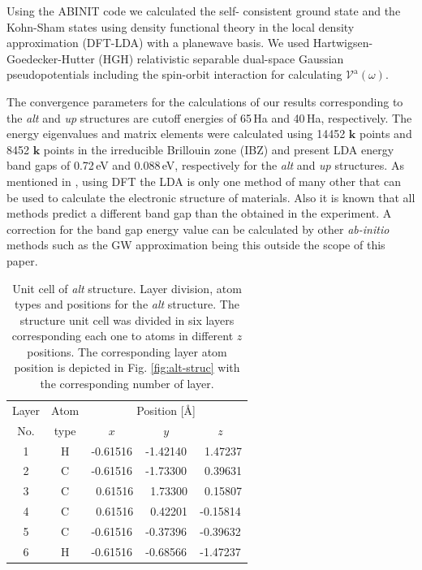 \documentclass[prb,11pt,tightenlines,twocolumn,aps]{revtex4-1}
\begin{document}
Using the ABINIT code \cite{gonzeCPC09} we calculated the self- consistent
ground state and the Kohn-Sham states using density functional theory in the
local density approximation (DFT-LDA) with a planewave basis. We used
Hartwigsen- Goedecker-Hutter (HGH) relativistic separable dual-space Gaussian
pseudopotentials \cite{hartwigsenPRB98} including the spin-orbit interaction
for calculating $\mathcal{V}^{\mathrm{a}}(\omega)$.

The convergence parameters for the calculations of our results corresponding to
the \emph{alt} and \emph{up} structures are cutoff energies of 65\,Ha and
40\,Ha, respectively. The energy eigenvalues and matrix elements were
calculated using 14452 $\mathbf{k}$ points and 8452 $\mathbf{k}$ points in the
irreducible Brillouin zone (IBZ) and present LDA energy band gaps of 0.72\,eV
and 0.088\,eV, respectively for the \emph{alt} and \emph{up} structures. As
mentioned in
\cite{zapataPSB2016}, using DFT the LDA is only one method of many other that
can be used to calculate the electronic structure of materials. Also it is
known that all methods predict a different band gap than the obtained in the
experiment. A correction for the band gap energy value can be calculated by
other \emph{ab-initio} methods such as the GW approximation \cite{onidaRMP02}
being this outside the scope of this paper.



\begin{table}[tb]
\center
\begin{tabular}{ccccc}\\
\hline
Layer & Atom & \multicolumn{3}{c}{Position [\AA]} \\
\cline{3-5}
No. & type & $x$ & $y$ & $z$  \\
\hline
1 & H &  -0.61516 &  -1.42140 & \ 1.47237 \\
2 & C &  -0.61516 &  -1.73300 & \ 0.39631 \\
3 & C & \ 0.61516 & \ 1.73300 & \ 0.15807 \\
4 & C & \ 0.61516 & \ 0.42201 &  -0.15814 \\
5 & C &  -0.61516 &  -0.37396 &  -0.39632 \\
6 & H &  -0.61516 &  -0.68566 &  -1.47237 \\
\hline
\end{tabular}
\caption{Unit cell of \emph{alt} structure. Layer division, atom types and
positions for the \emph{alt} structure. The structure unit cell was divided in
six layers corresponding each one to atoms in different $z$ positions. The
corresponding layer atom position is depicted in Fig. \ref{fig:alt-struc} with
the corresponding number of layer.}
\label{tab:alt-unitcell}
\end{table}
\end{document}
